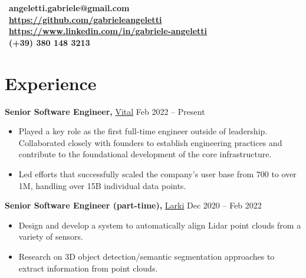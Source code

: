 \documentclass[margin]{res}
\begin{document}
    \begin{resume}
        \section{}
        \faEnvelope~\textbf{angeletti.gabriele@gmail.com} \\[5pt]
        \faGithub~\textbf{\url{https://github.com/gabrieleangeletti}} \\[5pt]
        \faLinkedin~\textbf{\url{https://www.linkedin.com/in/gabriele-angeletti}} \\[5pt]
        \faPhone~\textbf{(+39) 380 148 3213}

        \section{Experience}
            {\bf Senior Software Engineer, } \href{https://tryvital.io}{Vital}
            \hfill Feb 2022 -- Present
            \begin{itemize}
                \item Played a key role as the first full-time engineer outside of leadership. Collaborated closely with founders to establish engineering practices and contribute to the foundational development of the core infrastructure.
                \item Led efforts that successfully scaled the company's user base from 700 to over 1M, handling over 15B individual data points.
            \end{itemize}
        
            {\bf Senior Software Engineer (part-time),} \href{https://larki.com.au/}{Larki}
            \hfill Dec 2020 -- Feb 2022
            \begin{itemize}
                \item Design and develop a system to automatically align Lidar point clouds from a variety of sensors.
                \item Research on 3D object detection/semantic segmentation approaches to extract information from point clouds.
            \end{itemize}


\end{resume}
\end{document}

